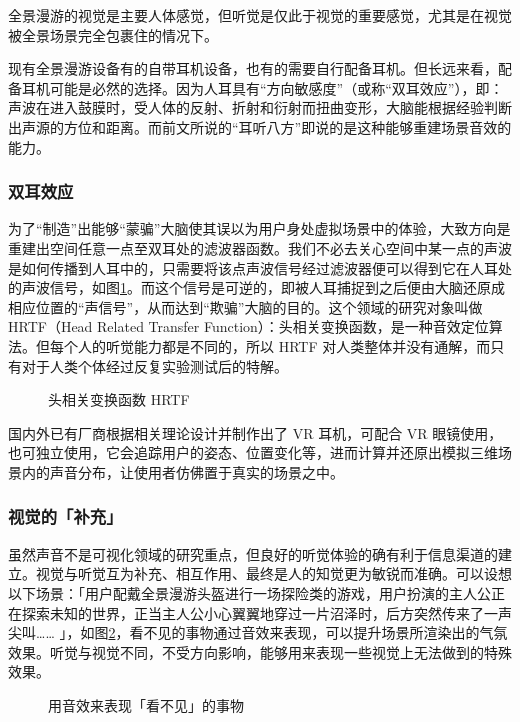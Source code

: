 全景漫游的视觉是主要人体感觉，但听觉是仅此于视觉的重要感觉，尤其是在视觉被全景场景完全包裹住的情况下。

现有全景漫游设备有的自带耳机设备，也有的需要自行配备耳机。但长远来看，配备耳机可能是必然的选择。因为人耳具有“方向敏感度”（或称“双耳效应”），即：声波在进入鼓膜时，受人体的反射、折射和衍射而扭曲变形，大脑能根据经验判断出声源的方位和距离。而前文所说的“耳听八方”即说的是这种能够重建场景音效的能力。

\subsubsection{双耳效应}
为了“制造”出能够“蒙骗”大脑使其误以为用户身处虚拟场景中的体验，大致方向是重建出空间任意一点至双耳处的滤波器函数。我们不必去关心空间中某一点的声波是如何传播到人耳中的，只需要将该点声波信号经过滤波器便可以得到它在人耳处的声波信号，如图\ref{fig:hrtf}。而这个信号是可逆的，即被人耳捕捉到之后便由大脑还原成相应位置的“声信号”，从而达到“欺骗”大脑的目的。这个领域的研究对象叫做 HRTF（Head Related Transfer Function）：头相关变换函数，是一种音效定位算法。但每个人的听觉能力都是不同的，所以 HRTF 对人类整体并没有通解，而只有对于人类个体经过反复实验测试后的特解。

\begin{figure}[htp]
\centering
{}
\caption{头相关变换函数 HRTF}
\label{fig:hrtf}
\end{figure}

国内外已有厂商根据相关理论设计并制作出了 VR 耳机，可配合 VR 眼镜使用，也可独立使用，它会追踪用户的姿态、位置变化等，进而计算并还原出模拟三维场景内的声音分布，让使用者仿佛置于真实的场景之中。

\subsubsection{视觉的「补充」}
虽然声音不是可视化领域的研究重点，但良好的听觉体验的确有利于信息渠道的建立。视觉与听觉互为补充、相互作用、最终是人的知觉更为敏锐而准确。可以设想以下场景：「用户配戴全景漫游头盔进行一场探险类的游戏，用户扮演的主人公正在探索未知的世界，正当主人公小心翼翼地穿过一片沼泽时，后方突然传来了一声尖叫…… 」，如图\ref{fig:audio-source}，看不见的事物通过音效来表现，可以提升场景所渲染出的气氛效果。听觉与视觉不同，不受方向影响，能够用来表现一些视觉上无法做到的特殊效果。

\begin{figure}[htp]
\centering
{}
\caption{用音效来表现「看不见」的事物}
\label{fig:audio-source}
\end{figure}

